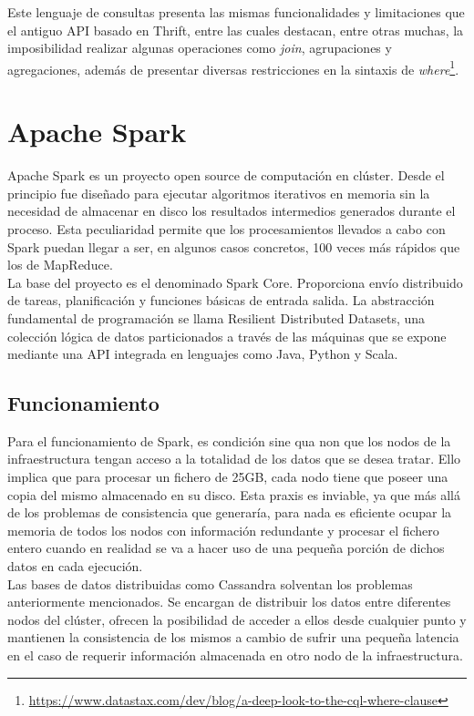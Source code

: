 Este lenguaje de consultas presenta las mismas funcionalidades y limitaciones que el antiguo API basado en Thrift, entre las cuales destacan, entre otras muchas, la imposibilidad realizar algunas operaciones como \textit{join}, agrupaciones y agregaciones, además de presentar diversas restricciones en la sintaxis de \textit{where}\footnote{\url{https://www.datastax.com/dev/blog/a-deep-look-to-the-cql-where-clause}}.

\section{Apache Spark}

Apache Spark\cite{zaharia2010spark} es un proyecto open source de computación en clúster. Desde el principio fue diseñado para ejecutar algoritmos iterativos en memoria sin la necesidad de almacenar en disco los resultados intermedios generados durante el proceso. Esta peculiaridad permite que los procesamientos llevados a cabo con Spark puedan llegar a ser, en algunos casos concretos, 100 veces más rápidos que los de MapReduce\cite{dean2008mapreduce}.\\

La base del proyecto es el denominado Spark Core. Proporciona envío distribuido de tareas, planificación y funciones básicas de entrada salida. La abstracción fundamental de programación se llama Resilient Distributed Datasets\cite{zaharia2012resilient}, una colección lógica de datos particionados a través de las máquinas que se expone mediante una API integrada en lenguajes como Java, Python y Scala.

\subsection{Funcionamiento}

Para el funcionamiento de Spark, es condición sine qua non que los nodos de la infraestructura tengan acceso a la totalidad de los datos que se desea tratar. Ello implica que para procesar un fichero de 25GB, cada nodo tiene que poseer una copia del mismo almacenado en su disco. Esta praxis es inviable, ya que más allá de los problemas de consistencia que generaría, para nada es eficiente ocupar la memoria de todos los nodos con información redundante y procesar el fichero entero cuando en realidad se va a hacer uso de una pequeña porción de dichos datos en cada ejecución.\\

Las bases de datos distribuidas como Cassandra solventan los problemas anteriormente mencionados. Se encargan de distribuir los datos entre diferentes nodos del clúster, ofrecen la posibilidad de acceder a ellos desde cualquier punto y mantienen la consistencia de los mismos a cambio de sufrir una pequeña latencia en el caso de requerir información almacenada en otro nodo de la infraestructura.\\ 

